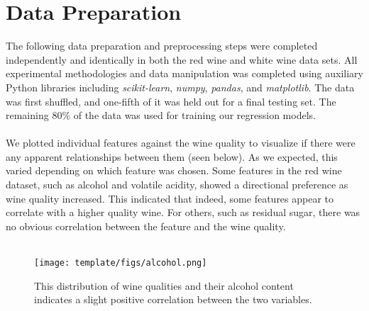 
\section{Data Preparation}
\label{sec:background}

The following data preparation and preprocessing steps were completed independently and identically in both the red wine and white wine data sets. All experimental methodologies and data manipulation was completed using auxiliary Python libraries including \textit{scikit-learn}, \textit{numpy}, \textit{pandas}, and \textit{matplotlib}. The data was first shuffled, and one-fifth of it was held out for a final testing set. The remaining 80\% of the data was used for training our regression models. \\\\
We plotted individual features against the wine quality to visualize if there were any apparent relationships between them (seen below). As we expected, this varied depending on which feature was chosen. Some features in the red wine dataset, such as alcohol and volatile acidity, showed a directional preference as wine quality increased. This indicated that indeed, some features appear to correlate with a higher quality wine. For others, such as residual sugar, there was no obvious correlation between the feature and the wine quality. \\\\
\begin{figure}[htb]

  \centering  %

  \texttt{[image: template/figs/alcohol.png]}

  \caption{This distribution of wine qualities and their alcohol content indicates a slight positive correlation between the two variables.}

  \label{fig:alcohol}

\end{figure}

